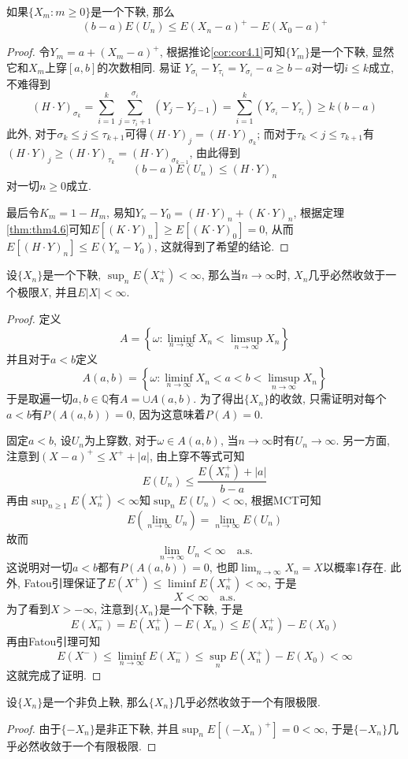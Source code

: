 \documentclass[cn, 12pt, math=mtpro2, bibstyle=apa, blue, twocol]{elegantbook}
\newcommand{\limn}{\lim_{n\to\infty}}
\begin{document}
\begin{theorem}[上穿不等式]
  如果$\{X_m:m\ge0\}$是一个下鞅, 那么
  $$(b-a)E(U_n)\leq E(X_n-a)^+-E(X_0-a)^+$$
\end{theorem}
\begin{proof}
  令$Y_m=a+(X_m-a)^+$, 根据推论\ref{cor:cor4.1}可知$\{Y_m\}$是一个下鞅, 显然它和$X_m$上穿$[a,b]$的次数相同. 易证
  $Y_{\sigma_i}-Y_{\tau_i}=Y_{\sigma_i}-a\ge b-a$对一切$i\le k$成立, 不难得到
  $$(H\cdot Y)_{\sigma_k}=\sum_{i=1}^{k}\sum_{j=\tau_i+1}^{\sigma_i}(Y_j-Y_{j-1})=\sum_{i=1}^{k}(Y_{\sigma_i}-Y_{\tau_i})\ge k(b-a)$$
  此外, 对于$\sigma_k\leq j\leq \tau_{k+1}$可得$(H\cdot Y)_j=(H\cdot Y)_{\sigma_k}$; 而对于$\tau_k<j\leq \tau_{k+1}$有$(H\cdot Y)_j\ge (H\cdot Y)_{\tau_k}=(H\cdot Y)_{\sigma_{k-1}}$, 由此得到
  $$(b-a)E(U_n)\leq (H\cdot Y)_n$$
  对一切$n\ge0$成立.

  最后令$K_m=1-H_m$, 易知$Y_n-Y_0=(H\cdot Y)_n+(K\cdot Y)_n$, 根据定理\ref{thm:thm4.6}可知$E[(K\cdot Y)_n]\geq E[(K\cdot Y)_0]=0$, 从而$E[(H\cdot Y)_n]\leq E(Y_n-Y_0)$, 这就得到了希望的结论.
\end{proof}

\begin{theorem}[鞅收敛定理]
  设$\{X_n\}$是一个下鞅, $\sup_n E(X_n^+)<\infty$, 那么当$n\to\infty$时, $X_n$几乎必然收敛于一个极限$X$, 并且$E|X|<\infty$.
\end{theorem}
\begin{proof}
定义
$$A=\left\{\omega: \liminf_{n\to\infty}X_n<\limsup_{n\to\infty}X_n\right\}$$
并且对于$a<b$定义
$$A(a,b)=\left\{\omega:\liminf_{n\to\infty}X_n<a<b<\limsup_{n\to\infty}X_n\right\}$$
于是取遍一切$a,b\in\mathbb{Q}$有$A=\cup A(a,b)$. 为了得出$\{X_n\}$的收敛, 只需证明对每个$a<b$有$P(A(a,b))=0$, 因为这意味着$P(A)=0$.

固定$a<b$, 设$U_n$为上穿数, 对于$\omega\in A(a,b)$, 当$n\to\infty$时有$U_n\to\infty$. 另一方面, 注意到$(X-a)^+\leq X^++|a|$, 由上穿不等式可知
$$E(U_n)\leq\frac{E(X_n^+)+|a|}{b-a}$$
再由$\sup_{n\ge1}E(X_n^+)<\infty$知$\sup_n E(U_n)<\infty$, 根据MCT可知
$$E\left(\limn U_n\right)=\limn E(U_n)$$
故而$$\limn U_n<\infty\quad\text{a.s.}$$这说明对一切$a<b$都有$P(A(a,b))=0$, 也即$\limn X_n=X$以概率1存在. 此外, Fatou引理保证了$E(X^+)\leq\liminf E(X_n^+)<\infty$, 于是
$$X<\infty\quad\text{a.s.}$$
为了看到$X>-\infty$, 注意到$\{X_n\}$是一个下鞅, 于是
$$E(X_n^-)=E(X_n^+)-E(X_n)\leq E(X_n^+)-E(X_0)$$
再由Fatou引理可知
$$E(X^-)\leq\liminf_{n\to\infty}E(X_n^-)\leq\sup_nE(X_n^+)-E(X_0)<\infty$$
这就完成了证明.
\end{proof}
\begin{corollary}
设$\{X_n\}$是一个非负上鞅, 那么$\{X_n\}$几乎必然收敛于一个有限极限.
\end{corollary}
\begin{proof}
  由于$\{-X_n\}$是非正下鞅, 并且$\sup_nE[(-X_n)^+]=0<\infty$, 于是$\{-X_n\}$几乎必然收敛于一个有限极限.
\end{proof}
\end{document}
